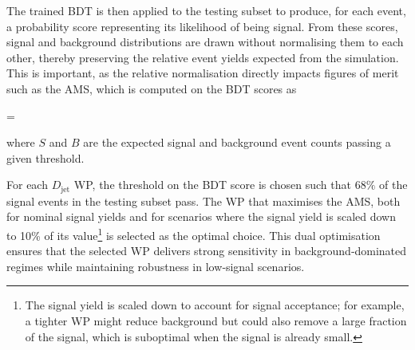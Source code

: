 The trained \ac{BDT} is then applied to the testing subset to produce, for each event, a probability score representing its likelihood of being signal. From these scores, signal and background distributions are drawn without normalising them to each other, thereby preserving the relative event yields expected from the simulation. This is important, as the relative normalisation directly impacts figures of merit such as the \ac{AMS}, which is computed on the \ac{BDT} scores as

\begin{equation_pad}
 =  
\end{equation_pad}

where $S$ and $B$ are the expected signal and background event counts passing a given threshold.  

For each $D_{\text{jet}}$ \ac{WP}, the threshold on the \ac{BDT} score is chosen such that $68\%$ of the signal events in the testing subset pass. The \ac{WP} that maximises the \ac{AMS}, both for nominal signal yields and for scenarios where the signal yield is scaled down to 10\% of its value\footnote{The signal yield is scaled down to account for signal acceptance; for example, a tighter \ac{WP} might reduce background but could also remove a large fraction of the signal, which is suboptimal when the signal is already small.} is selected as the optimal choice. This dual optimisation ensures that the selected \ac{WP} delivers strong sensitivity in background‑dominated regimes while maintaining robustness in low‑signal scenarios.

